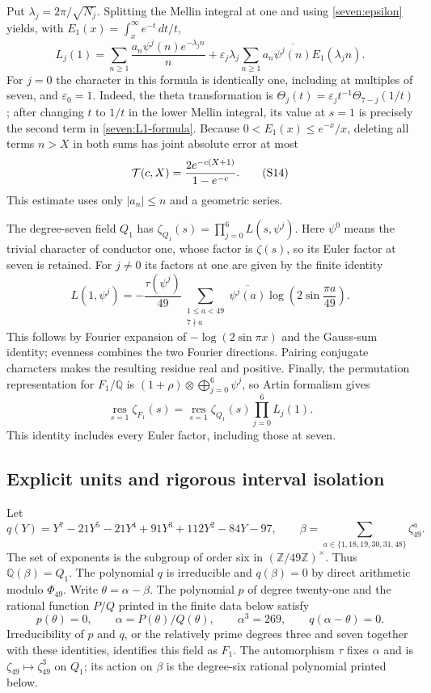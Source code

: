 \documentclass[11pt]{article}
\begin{document}
Put $\lambda_j=2\pi/\sqrt{N_j}$.
Splitting the Mellin integral at one and using
\eqref{seven:epsilon} yields, with
$E_1(x)=\int_x^\infty e^{-t}\,dt/t$,
\[
 L_j(1)=
 \sum_{n\ge1}\frac{a_n\psi^j(n)e^{-\lambda_jn}}{n}
 +\varepsilon_j \lambda_j
 \sum_{n\ge1}a_n\overline{\psi^j(n)}E_1(\lambda_jn).
 \tag{S13}\label{seven:L1-formula}
\]
For $j=0$ the character in this formula is identically one, including at
multiples of seven, and $\varepsilon_0=1$.
Indeed, the theta transformation is
$\Theta_j(t)=\varepsilon_jt^{-1}\Theta_{7-j}(1/t)$; after changing
$t$ to $1/t$ in the lower Mellin integral, its value at $s=1$ is precisely
the second term in \eqref{seven:L1-formula}.
Because $0<E_1(x)\le e^{-x}/x$, deleting all terms $n>X$ in both sums
has joint absolute error at most
\[
 {\cal T}(c,X)=\frac{2e^{-c(X+1)}}{1-e^{-c}}.
 \tag{S14}\label{seven:tail}
\]
This estimate uses only $|a_n|\le n$ and a geometric series.

The degree-seven field $Q_1$ has
$\zeta_{Q_1}(s)=\prod_{j=0}^6L(s,\psi^j)$.
Here $\psi^0$ means the trivial character of conductor one, whose factor is
$\zeta(s)$, so its Euler factor at seven is retained.
For $j\ne0$ its factors at one are given by the finite identity
\[
 L(1,\psi^j)=
 -\frac{\tau(\psi^j)}{49}
 \sum_{\substack{1\le a<49\\7\nmid a}}
       \overline{\psi^j(a)}
       \log\left(2\sin\frac{\pi a}{49}\right).
 \tag{S15}\label{seven:dirichlet-residue}
\]
This follows by Fourier expansion of $-\log(2\sin\pi x)$ and the
Gauss-sum identity; evenness combines the two Fourier directions.
Pairing conjugate characters makes the resulting residue real and positive.
Finally, the permutation representation for $F_1/\mathbb Q$ is
$(1+\rho)\otimes\bigoplus_{j=0}^6\psi^j$, so Artin formalism gives
\[
 \operatorname*{res}_{s=1}\zeta_{F_1}(s)
 =\operatorname*{res}_{s=1}\zeta_{Q_1}(s)
       \prod_{j=0}^6L_j(1).
 \tag{S16}\label{seven:residue-factorization}
\]
This identity includes every Euler factor, including those at seven.

\subsection{Explicit units and rigorous interval isolation}
\label{seven:certification}

Let
\[
 q(Y)=Y^7-21Y^5-21Y^4+91Y^3+112Y^2-84Y-97,
 \qquad
 \beta=\sum_{a\in\{1,18,19,30,31,48\}}\zeta_{49}^{a}.
 \tag{S17}\label{seven:period}
\]
The set of exponents is the subgroup of order six in
$(\mathbb Z/49\mathbb Z)^\times$. Thus $\mathbb Q(\beta)=Q_1$.
The polynomial $q$ is irreducible and $q(\beta)=0$ by direct arithmetic
modulo $\Phi_{49}$.
Write $\theta=\alpha-\beta$. The polynomial $p$ of degree twenty-one and
the rational function $P/Q$ printed in the finite data below satisfy
\[
 p(\theta)=0,\qquad \alpha=P(\theta)/Q(\theta),\qquad
 \alpha^3=269,\qquad q(\alpha-\theta)=0.
 \tag{S18}\label{seven:field-identity}
\]
Irreducibility of $p$ and $q$, or the relatively prime degrees three and
seven together with these identities, identifies this field as $F_1$.
The automorphism $\tau$ fixes $\alpha$ and is
$\zeta_{49}\mapsto\zeta_{49}^3$ on $Q_1$; its action on $\beta$ is the
degree-six rational polynomial printed below.
\end{document}

